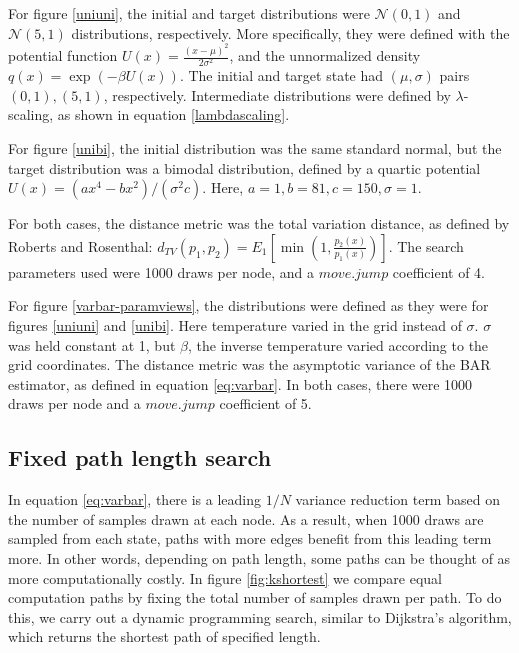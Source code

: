 For figure \ref{uniuni}, the initial and target distributions were $\mathcal{N}(0,1)$ and $\mathcal{N}(5,1)$ distributions, respectively.
More specifically, they were defined with the potential function $U(x) = \frac{(x-\mu)^2}{2\sigma^2}$, and the unnormalized density $q(x) = \exp(-\beta U(x))$.
The initial and target state had $(\mu, \sigma)$ pairs $(0,1), (5,1)$, respectively.
Intermediate distributions were defined by $\lambda$-scaling, as shown in equation \eqref{lambdascaling}.

For figure \ref{unibi}, the initial distribution was the same standard normal, but the target distribution was a bimodal distribution, defined by a quartic potential $U(x) = (ax^4 - bx^2)/(\sigma^2c)$. Here, $a=1, b=81, c=150, \sigma=1$.

For both cases, the distance metric was the total variation distance, as defined by Roberts and Rosenthal\cite{roberts2004general}: $d_{TV}(p_1, p_2)=E_1 \left [\min \left (1,\frac{p_2(x)}{p_1(x)} \right ) \right ]$. 
The search parameters used were 1000 draws per node, and a $move.jump$ coefficient of 4.

For figure \ref{varbar-paramviews}, the distributions were defined as they were for figures \ref{uniuni} and \ref{unibi}. Here temperature varied in the grid instead of $\sigma$. $\sigma$ was held constant at 1, but $\beta$, the inverse temperature varied according to the grid coordinates.
The distance metric was the asymptotic variance of the BAR estimator, as defined in equation \eqref{eq:varbar}.
In both cases, there were 1000 draws per node and a $move.jump$ coefficient of 5.


\subsection{Fixed path length search} %
\label{sub:fixed_path_length_search}

In equation \eqref{eq:varbar}, there is a leading $1/N$ variance reduction term based on the number of samples drawn at each node. 
As a result, when 1000 draws are sampled from each state, paths with more edges benefit from this leading term more.
In other words, depending on path length, some paths can be thought of as more computationally costly.
In figure \ref{fig:kshortest} we compare equal computation paths by fixing the total number of samples drawn per path.
To do this, we carry out a dynamic programming search, similar to Dijkstra's algorithm, which returns the shortest path of specified length. 

